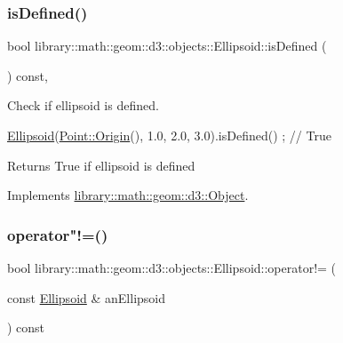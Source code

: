 \subsubsection{\texorpdfstring{is\+Defined()}{isDefined()}}
{\footnotesize\ttfamily bool library\+::math\+::geom\+::d3\+::objects\+::\+Ellipsoid\+::is\+Defined (\begin{DoxyParamCaption}{ }\end{DoxyParamCaption}) const\hspace{0.3cm}{\ttfamily [override]}, {\ttfamily [virtual]}}



Check if ellipsoid is defined. 


\begin{DoxyCode}
\hyperlink{classlibrary_1_1math_1_1geom_1_1d3_1_1objects_1_1_ellipsoid_aae81fe0edc7f0e8d4590ea89ae73cb14}{Ellipsoid}(\hyperlink{classlibrary_1_1math_1_1geom_1_1d3_1_1objects_1_1_point_ab2a38e285c562e50bf350272c083986f}{Point::Origin}(), 1.0, 2.0, 3.0).isDefined() ; \textcolor{comment}{// True}
\end{DoxyCode}


\begin{DoxyReturn}{Returns}
True if ellipsoid is defined 
\end{DoxyReturn}


Implements \hyperlink{classlibrary_1_1math_1_1geom_1_1d3_1_1_object_a2216442e322f0c3ca5f01a4efa22baf7}{library\+::math\+::geom\+::d3\+::\+Object}.

\mbox{\label{classlibrary_1_1math_1_1geom_1_1d3_1_1objects_1_1_ellipsoid_af6e0b91e6de57a4fa4c027442613d91b}} 
\subsubsection{\texorpdfstring{operator"!=()}{operator!=()}}
{\footnotesize\ttfamily bool library\+::math\+::geom\+::d3\+::objects\+::\+Ellipsoid\+::operator!= (\begin{DoxyParamCaption}\item[{const \hyperlink{classlibrary_1_1math_1_1geom_1_1d3_1_1objects_1_1_ellipsoid}{Ellipsoid} \&}]{an\+Ellipsoid }\end{DoxyParamCaption}) const}




